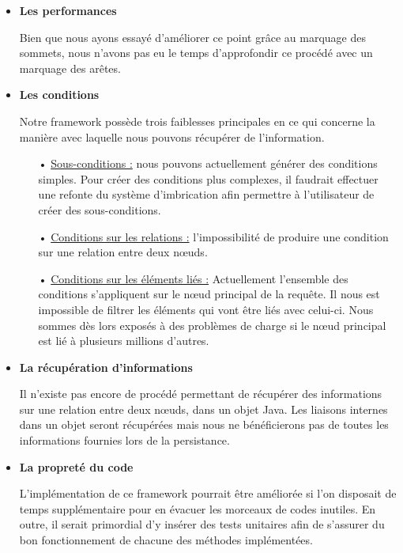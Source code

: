 \documentclass[a4paper,fleqn,12pt,oneside]{report}
\begin{document}
\begin{itemize}
\item \textbf{Les performances}

\quad Bien que nous ayons essayé d'améliorer ce point grâce au marquage des sommets, nous n'avons pas eu le temps d'approfondir ce procédé avec un marquage des arêtes.

\item \textbf{Les conditions}

\quad Notre framework possède trois faiblesses principales en ce qui concerne la manière avec laquelle nous pouvons récupérer de l'information.
\begin{itemize}
	\item[•] \underline{Sous-conditions :} nous pouvons actuellement générer des conditions simples. Pour créer des conditions plus complexes, il faudrait effectuer une refonte du système d'imbrication afin permettre à l'utilisateur de créer des sous-conditions. 
	\item[•] \underline{Conditions sur les relations :} l'impossibilité de produire une condition sur une relation entre deux nœuds.
	\item[•] \underline{Conditions sur les éléments liés :} Actuellement l'ensemble des conditions s'appliquent sur le nœud principal de la requête. Il nous est impossible de filtrer les éléments qui vont être liés avec celui-ci. Nous sommes dès lors exposés à des problèmes de charge si le nœud principal est lié à plusieurs millions d'autres.
\end{itemize}

\item \textbf{La récupération d'informations}

\quad Il n'existe pas encore de procédé permettant de récupérer des informations sur une relation entre deux nœuds, dans un objet Java. Les  liaisons internes dans un objet seront récupérées mais nous ne bénéficierons pas de toutes les informations fournies lors de la persistance.

\item \textbf{La propreté du code}

\quad L'implémentation de ce framework pourrait être améliorée si l'on disposait de temps supplémentaire pour en évacuer les morceaux de codes inutiles. En outre, il serait primordial d'y insérer des tests unitaires afin de s'assurer du bon fonctionnement de chacune des méthodes implémentées.

\end{itemize}  
\end{document}
